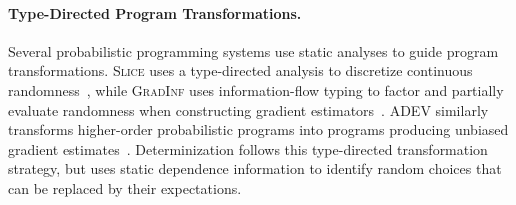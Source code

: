 \paragraph{Type-Directed Program Transformations.}
Several probabilistic programming systems use static analyses to guide program transformations. \textsc{Slice} uses a type-directed analysis to discretize continuous randomness~\cite{wu2026slice}, while \textsc{GradInf} uses information-flow typing to factor and partially evaluate randomness when constructing gradient estimators~\cite{arya2026gradinf}. \textsc{ADEV} similarly transforms higher-order probabilistic programs into programs producing unbiased gradient estimates~\cite{lew2023adev}. Determinization follows this type-directed transformation strategy, but uses static dependence information to identify random choices that can be replaced by their expectations. 

